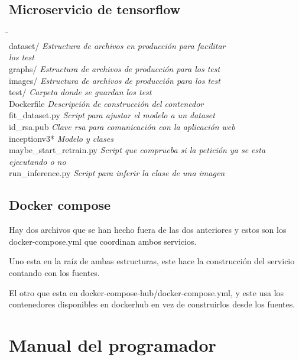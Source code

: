 \subsection{Microservicio de tensorflow}
\begin{tabbing}

\hphantom{tab tab tab tab tab tab tab tab }\= \kill\\
dataset/ \> \textit{Estructura de archivos en producción para facilitar} \\
\> \textit{los test} \\
graphs/ \> \textit{Estructura de archivos de producción para los test} \\
images/ \> \textit{Estructura de archivos de producción para los test} \\
test/ \> \textit{Carpeta donde se guardan los test} \\
Dockerfile \> \textit{Descripción de construcción del contenedor} \\
fit\_dataset.py \> \textit{Script para ajustar el modelo a un dataset} \\
id\_rsa.pub \> \textit{Clave rsa para comunicación con la aplicación web} \\
inceptionv3* \> \textit{Modelo y clases} \\
maybe\_start\_retrain.py \> \textit{Script que comprueba si la petición ya se esta} \\ 
\> \textit{ejecutando o no} \\
run\_inference.py \> \textit{Script para inferir la clase de una imagen} \\
\end{tabbing}

\subsection{Docker compose}
Hay dos archivos que se han hecho fuera de las dos anteriores y estos son los docker-compose.yml que coordinan ambos servicios. 

Uno esta en la raíz de ambas estructuras, este hace la construcción del servicio contando con los fuentes.

El otro que esta en docker-compose-hub/docker-compose.yml, y este usa los contenedores disponibles en dockerhub en vez de construirlos desde los fuentes.


\section{Manual del programador}

